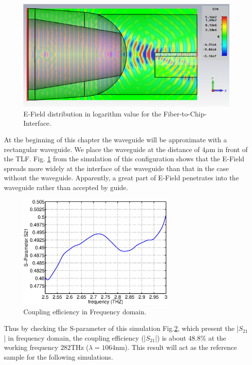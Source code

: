 \begin{figure}[!ht]
\centering
	\includegraphics[width=0.7 \textwidth]{bilder/cst_basic_waveguide_efield}
	\caption{E-Field distribution in logarithm value for the Fiber-to-Chip-Interface.}	
	\label{fig:coupling_e_field}
\end{figure}
At the beginning of this chapter the waveguide will be approximate with a rectangular waveguide. We place the waveguide at the distance of $4\mu$m in front of the TLF.  Fig. \ref{fig:coupling_e_field} from the simulation of this configuration shows that the E-Field spreads more widely at the interface of the waveguide than that in the case without the waveguide. Apparently, a great part of E-Field penetrates into the waveguide rather than accepted by guide.\\
 
\begin{figure}[!ht]
\centering
\includegraphics[width=0.7\textwidth]{bilder/original_coupling_efficiency}
\caption{Coupling efficiency in Frequency domain.}
\label{fig:orignial_coupling_efficiency}
\end{figure}
Thus by checking the S-parameter of this simulation Fig.\ref{fig:orignial_coupling_efficiency}, which present the |$S_{21}$| in frequency domain, the coupling efficiency (|$S_{21}$|) is about $48.8\%$ at the working frequency $282$THz ($\lambda=1064$nm). This result will act as the reference sample for the following simulations.\\ 


